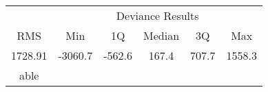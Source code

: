 \documentclass{article}
\begin{document}
\begin{tabular}{cccccc}
  \toprule
  &\multicolumn{5}{c}{Deviance Results}\\
  \cmidrule{2-6}
  RMS & Min & 1Q & Median & 3Q & Max\\
  \midrule
  1728.91 & -3060.7  & -562.6 &   167.4 &   707.7 &  1558.3\\
  \bottomrule
  \caption table
\end{tabular}
\end{document}
